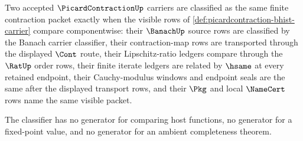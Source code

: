 \begin{definition}
\label{def:picardcontraction-classifier}
Two accepted $\PicardContractionUp$ carriers are classified as the same
finite contraction packet exactly when the visible rows of
\autoref{def:picardcontraction-bhist-carrier} compare componentwise: their
$\BanachUp$ source rows are classified by the Banach carrier classifier, their
contraction-map rows are transported through the displayed $\Cont$ route,
their Lipschitz-ratio ledgers compare through the $\RatUp$ order rows, their
finite iterate ledgers are related by $\hsame$ at every retained endpoint,
their Cauchy-modulus windows and endpoint seals are the same after the
displayed transport rows, and their $\Pkg$ and local $\NameCert$ rows name the
same visible packet.

The classifier has no generator for comparing host functions, no generator
for a fixed-point value, and no generator for an ambient completeness theorem.
\end{definition}

